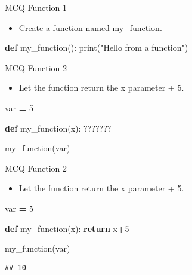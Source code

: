 \documentclass[
  8pt,
  ignorenonframetext,
]{beamer}
\newenvironment{Shaded}{\begin{snugshade}}{\end{snugshade}}
\newcommand{\BuiltInTok}[1]{#1}
\newcommand{\ControlFlowTok}[1]{\textcolor[rgb]{0.13,0.29,0.53}{\textbf{#1}}}
\newcommand{\DecValTok}[1]{\textcolor[rgb]{0.00,0.00,0.81}{#1}}
\newcommand{\KeywordTok}[1]{\textcolor[rgb]{0.13,0.29,0.53}{\textbf{#1}}}
\newcommand{\NormalTok}[1]{#1}
\newcommand{\OperatorTok}[1]{\textcolor[rgb]{0.81,0.36,0.00}{\textbf{#1}}}
\newcommand{\StringTok}[1]{\textcolor[rgb]{0.31,0.60,0.02}{#1}}
\providecommand{\tightlist}{%
  \setlength{\itemsep}{0pt}\setlength{\parskip}{0pt}}
\begin{document}
\begin{frame}[fragile]{MCQ Function 1}
\protect\hypertarget{mcq-function-1-1}{}
\begin{itemize}
\tightlist
\item
  Create a function named my\_function.
\end{itemize}

\begin{Shaded}
\begin{Highlighting}[]
\KeywordTok{def}\NormalTok{ my\_function():}
  \BuiltInTok{print}\NormalTok{(}\StringTok{"Hello from a function"}\NormalTok{)}
\end{Highlighting}
\end{Shaded}
\end{frame}

\begin{frame}[fragile]{MCQ Function 2}
\protect\hypertarget{mcq-function-2}{}
\begin{itemize}
\tightlist
\item
  Let the function return the x parameter + 5.
\end{itemize}

\begin{Shaded}
\begin{Highlighting}[]
\NormalTok{var }\OperatorTok{=} \DecValTok{5}

\KeywordTok{def}\NormalTok{ my\_function(x):}
\NormalTok{  ???????}
  
\NormalTok{my\_function(var)}
\end{Highlighting}
\end{Shaded}
\end{frame}

\begin{frame}[fragile]{MCQ Function 2}
\protect\hypertarget{mcq-function-2-1}{}
\begin{itemize}
\tightlist
\item
  Let the function return the x parameter + 5.
\end{itemize}

\begin{Shaded}
\begin{Highlighting}[]
\NormalTok{var }\OperatorTok{=} \DecValTok{5}

\KeywordTok{def}\NormalTok{ my\_function(x):}
  \ControlFlowTok{return}\NormalTok{ x}\OperatorTok{+}\DecValTok{5}

\NormalTok{my\_function(var)}
\end{Highlighting}
\end{Shaded}

\begin{verbatim}
## 10
\end{verbatim}
\end{frame}
\end{document}
